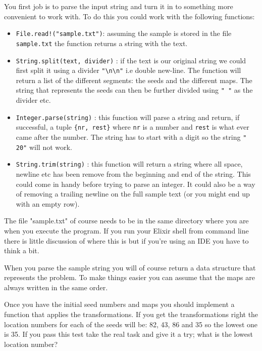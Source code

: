 \documentclass[a4paper,11pt]{article}
\begin{document}
You first job is to parse the input string and turn it in to something
more convenient to work with. To do this you could work with the following functions:

\begin{itemize}

\item {\tt File.read!("sample.txt")}: assuming the sample is stored in
  the file {\tt sample.txt} the function returns a string with the text.

\item {\tt String.split(text, divider)} : if the text is our original
  string we could first split it using a divider {\tt "\textbackslash n\textbackslash n"} i.e double
  new-line. The function will return a list of the different segments:
  the seeds and the different maps. The string that represents the
  seeds can then be further divided using {\tt " "} as the divider etc.

\item {\tt Integer.parse(string)} : this function will parse a string
  and return, if successful, a tuple {\tt \{nr, rest\}} where {\tt nr}
  is a number and {\tt rest} is what ever came after the number. The
  string has to start with a digit so the string {\tt " 20"} will not work.

\item {\tt String.trim(string)} : this function will return a string
  where all space, newline etc has been remove from the beginning and
  end of the string. This could come in handy before trying to parse
  an integer. It could also be a way of removing a trailing newline on
  the full sample text (or you might end up with an empty row).
\end{itemize}

The file "sample.txt" of course needs to be in the same directory
where you are when you execute the program. If you run your Elixir
shell from command line there is little discussion of where this is
but if you're using an IDE you have to think a bit.

When you parse the sample string you will of course return a data
structure that represents the problem. To make things easier you can
assume that the maps are always written in the same order. 

Once you have the initial seed numbers and maps you should implement a
function that applies the transformations.  If you get the
transformations right the location numbers for each of the seeds will
be: 82, 43, 86 and 35 so the lowest one is 35. If you pass this test
take the real task and give it a try; what is the lowest location
number?
\end{document}

